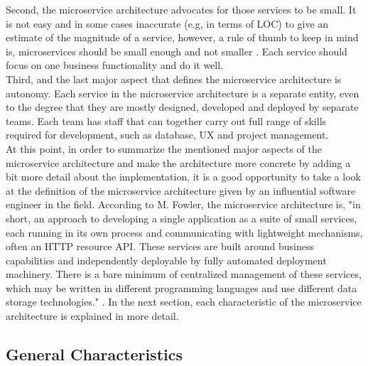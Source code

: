 \documentclass{Configuration_Files/PoliMi3i_thesis}
\begin{document}
Second, the microservice architecture advocates for those services to be small.
It is not easy and in some cases inaccurate (e.g, in terms of LOC) to give an estimate of the magnitude of a service, however, a rule of thumb to keep in mind is, microservices should be small enough and not smaller \cite{newman}.
Each service should focus on one business functionality and do it well.
\\
Third, and the last major aspect that defines the microservice architecture is autonomy.
Each service in the microservice architecture is a separate entity, even to the degree that they are mostly designed, developed and deployed by separate teams.
Each team has staff that can together carry out full range of skills required for development, such as database, UX and project management.
\\
At this point, in order to summarize the mentioned major aspects of the microservice architecture and make the architecture more concrete by adding a bit more detail about the implementation, it is a good opportunity to take a look at the definition of the microservice architecture given by an influential software engineer in the field.
According to M. Fowler, the microservice architecture is, "in short, an approach to developing a single application as a suite of small services, each running in its own process and communicating with lightweight mechanisms, often an HTTP resource API.
These services are built around business capabilities and independently deployable by fully automated deployment machinery.
There is a bare minimum of centralized management of these services, which may be written in different programming languages and use different data storage technologies." \cite{microdef}.
In the next section, each characteristic of the microservice architecture is explained in more detail.

\subsection{General Characteristics}
\label{subsec:chars}
\end{document}
